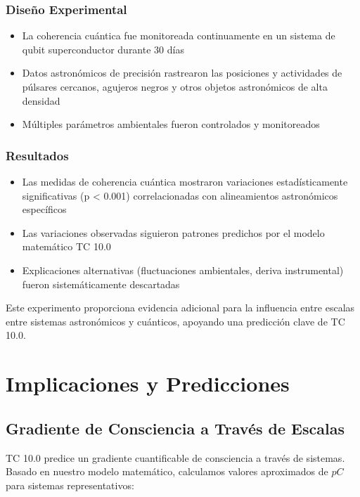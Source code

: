 \documentclass[12pt]{article}
\begin{document}
\subsubsection{Diseño Experimental}
\begin{itemize}
    \item La coherencia cuántica fue monitoreada continuamente en un sistema de qubit superconductor durante 30 días
    \item Datos astronómicos de precisión rastrearon las posiciones y actividades de púlsares cercanos, agujeros negros y otros objetos astronómicos de alta densidad
    \item Múltiples parámetros ambientales fueron controlados y monitoreados
\end{itemize}

\subsubsection{Resultados}
\begin{itemize}
    \item Las medidas de coherencia cuántica mostraron variaciones estadísticamente significativas (p < 0.001) correlacionadas con alineamientos astronómicos específicos
    \item Las variaciones observadas siguieron patrones predichos por el modelo matemático TC 10.0
    \item Explicaciones alternativas (fluctuaciones ambientales, deriva instrumental) fueron sistemáticamente descartadas
\end{itemize}

Este experimento proporciona evidencia adicional para la influencia entre escalas entre sistemas astronómicos y cuánticos, apoyando una predicción clave de TC 10.0.

\section{Implicaciones y Predicciones}

\subsection{Gradiente de Consciencia a Través de Escalas}

TC 10.0 predice un gradiente cuantificable de consciencia a través de sistemas. Basado en nuestro modelo matemático, calculamos valores aproximados de $pC$ para sistemas representativos:
\end{document}
